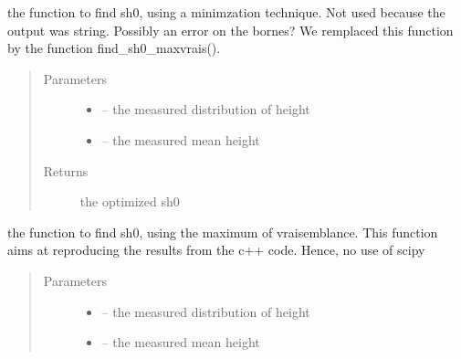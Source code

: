 \documentclass[letterpaper,10pt,english]{sphinxmanual}
\begin{document}
\begin{fulllineitems}

\begin{fulllineitems}
\label{\detokenize{index:src.stathab_c.Stathab.find_sh0}}
the function to find sh0, using a minimzation technique. Not used because the output was string.
Possibly an error on the bornes? We remplaced this function by the function find\_sh0\_maxvrais().
\begin{quote}\begin{description}
\item[{Parameters}] \leavevmode\begin{itemize}
\item {} 
 -- the measured distribution of height

\item {} 
 -- the measured mean height

\end{itemize}

\item[{Returns}] \leavevmode
the optimized sh0

\end{description}\end{quote}

\end{fulllineitems}


\begin{fulllineitems}
\label{\detokenize{index:src.stathab_c.Stathab.find_sh0_maxvrais}}
the function to find sh0, using the maximum of vraisemblance.
This function aims at reproducing the results from the c++ code. Hence, no use of scipy
\begin{quote}\begin{description}
\item[{Parameters}] \leavevmode\begin{itemize}
\item {} 
 -- the measured distribution of height

\item {} 
 -- the measured mean height

\end{itemize}


\end{description}
\end{quote}
\end{fulllineitems}
\end{fulllineitems}
\end{document}
